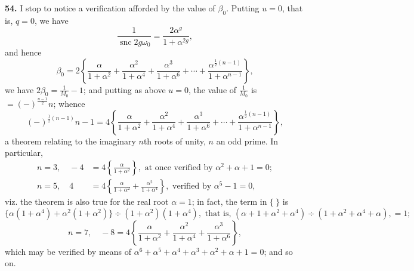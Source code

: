 \documentclass[12pt,a4paper]{article}
\DeclareMathOperator{\snc}{snc}
\begin{document}
\textbf{54.} I stop to notice a verification afforded by the value of $\beta_0$. Putting $u = 0$, that is, $q = 0$, we have
\[
\frac{1}{\snc 2g\omega_0} = \frac{2\alpha^g}{1 + \alpha^{2g}},
\]
and hence
\[
\beta_0 = 2\left\{
\frac{\alpha}{1 + \alpha^2} + \frac{\alpha^2}{1 + \alpha^4} + \frac{\alpha^3}{1 + \alpha^6} + \cdots
+ \frac{\alpha^{\frac{1}{2}(n-1)}}{1 + \alpha^{n-1}}\right\},
\]
we have $2\beta_0 = \frac{1}{M_0} - 1$; and putting as above $u = 0$, the value of $\frac{1}{M_0}$ is $= (-)^{\frac{n-1}{2}}n$; whence
\[
(-)^{\frac{1}{2}(n-1)}n - 1 = 4\left\{
\frac{\alpha}{1 + \alpha^2} + \frac{\alpha^2}{1 + \alpha^4} + \frac{\alpha^3}{1 + \alpha^6} + \cdots
+ \frac{\alpha^{\frac{1}{2}(n-1)}}{1 + \alpha^{n-1}}\right\},
\]
a theorem relating to the imaginary $n$th roots of unity, $n$ an odd prime. In particular,
\begin{align*}
n = 3, \quad -4 &= 4\left\{\frac{\alpha}{1 + \alpha^2}\right\}, \text{ at once verified by } \alpha^2 + \alpha + 1 = 0; \\
n = 5, \quad 4 &= 4\left\{\frac{\alpha}{1 + \alpha^2} + \frac{\alpha^2}{1 + \alpha^4}\right\}, \text{ verified by } \alpha^5 - 1 = 0,
\end{align*}
viz. the theorem is also true for the real root $\alpha = 1$; in fact, the term in $\{~\}$ is
\[
\{\alpha(1 + \alpha^4) + \alpha^2(1 + \alpha^2)\} \div (1 + \alpha^2)(1 + \alpha^4),
\text{ that is, } (\alpha + 1 + \alpha^2 + \alpha^4) \div (1 + \alpha^2 + \alpha^4 + \alpha), = 1;
\]
\[
n = 7, \quad -8 = 4\left\{\frac{\alpha}{1 + \alpha^2} + \frac{\alpha^2}{1 + \alpha^4} + \frac{\alpha^3}{1 + \alpha^6}\right\},
\]
which may be verified by means of $\alpha^6 + \alpha^5 + \alpha^4 + \alpha^3 + \alpha^2 + \alpha + 1 = 0$; and so on.
\end{document}
